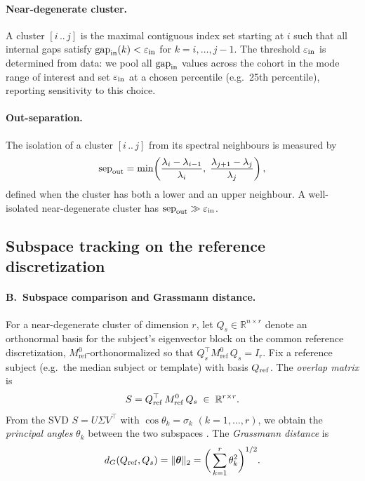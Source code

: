 \documentclass[11pt]{article}
\begin{document}
\paragraph{Near-degenerate cluster.}
A cluster $[i\,..\,j]$ is the maximal contiguous index set starting at $i$ such that all internal gaps satisfy $\mathrm{gap}_{\rm in}(k)<\varepsilon_{\rm in}$ for $k=i,\ldots,j{-}1$.
The threshold $\varepsilon_{\rm in}$ is determined from data: we pool all $\mathrm{gap}_{\rm in}$ values across the cohort in the mode range of interest and set $\varepsilon_{\rm in}$ at a chosen percentile (e.g.\ 25th percentile), reporting sensitivity to this choice.

\paragraph{Out-separation.}
The isolation of a cluster $[i\,..\,j]$ from its spectral neighbours is measured by
\begin{equation}\label{eq:sep-out}
\mathrm{sep}_{\rm out} = \min\!\left(
  \frac{\lambda_i - \lambda_{i-1}}{\lambda_i},\;
  \frac{\lambda_{j+1} - \lambda_j}{\lambda_j}
\right),
\end{equation}
defined when the cluster has both a lower and an upper neighbour.
A well-isolated near-degenerate cluster has $\mathrm{sep}_{\rm out}\gg\varepsilon_{\rm in}$.

\subsection{Subspace tracking on the reference discretization}
\label{sec:subspace}

\paragraph{B.\ Subspace comparison and Grassmann distance.}
For a near-degenerate cluster of dimension $r$, let $Q_s\in\mathbb R^{n\times r}$ denote an orthonormal basis for the subject's eigenvector block on the common reference discretization, $M_{\mathrm{ref}}^{0}$-orthonormalized so that $Q_s^\top M_{\mathrm{ref}}^{0}\, Q_s = I_r$.
Fix a reference subject (e.g.\ the median subject or template) with basis $Q_{\rm ref}$.
The \emph{overlap matrix} is
\begin{equation}\label{eq:overlap}
S = Q_{\rm ref}^\top\, M_{\mathrm{ref}}^{0}\, Q_s \;\in\;\mathbb R^{r\times r}.
\end{equation}
From the SVD $S=U\Sigma V^\top$ with $\cos\theta_k = \sigma_k$ $(k=1,\ldots,r)$, we obtain the \emph{principal angles} $\theta_k$ between the two subspaces \citep{BjorckGolub1973Angles}.
The \emph{Grassmann distance} is
\begin{equation}\label{eq:grassmann}
d_G(Q_{\rm ref}, Q_s) = \|\boldsymbol\theta\|_2 = \bigg(\sum_{k=1}^{r}\theta_k^2\bigg)^{1/2}.
\end{equation}
\end{document}
